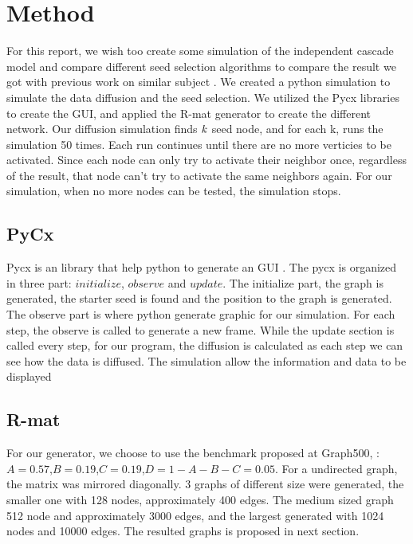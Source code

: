 \chapter{Method}
For this report, we wish too create some simulation of the independent cascade model and compare different seed selection algorithms to compare the result we got with previous work on similar subject \cite{MaximizeSpread2015}. We created a python simulation to simulate the data diffusion and the seed selection. We utilized the Pycx libraries to create the GUI, and applied the R-mat generator to create the different network. Our diffusion simulation finds $\it{k}$ seed node, and for each k, runs the simulation 50 times. Each run continues until there are no more verticies to be activated. Since each node can only try to activate their neighbor once, regardless of the result, that node can't try to activate the same neighbors again. For our simulation, when no more nodes can be tested, the simulation stops. 

\section{PyCx}
Pycx is an library that help python to generate an GUI \cite{Pycx}. The pycx is organized in three part: $initialize$, $observe$ and $update$. The initialize part, the graph is generated, the starter seed is found and the position to the graph is generated. The observe part is where python generate graphic for our simulation. For each step, the observe is called to generate a new frame. While the update section is called every step, for our program, the diffusion is calculated as each step we can see how the data is diffused. The simulation allow the information and data to be displayed 


\section{R-mat}
For our generator, we choose to  use the benchmark proposed at Graph500, :$A=0.57$,$B=0.19$,$C=0.19$,$D = 1-A-B-C = 0.05$. For a undirected graph, the matrix was mirrored diagonally. 3 graphs of different size were generated, the smaller one with 128 nodes, approximately 400 edges. The medium sized graph 512 node and approximately 3000 edges, and the largest generated with 1024 nodes and 10000 edges. The resulted graphs is proposed in next section. 

